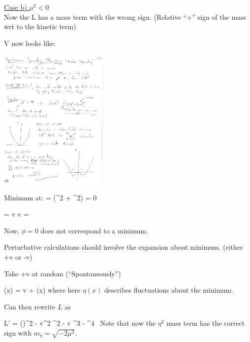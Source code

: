 {\clearpage

\underline{Case b) $\mu^2 < 0$}\\

Now the L has a mass term with the wrong sign.  
(Relative ``+'' sign of the mass wrt to the kinetic term)

V now looks like:

\bc
\includegraphics[width=0.4\textwidth]{./V_mu2negative.pdf}
\ec

Minimum at:
\be
{} = \phi (\mu^2 + \lambda \phi^2) = 0 
\ee

\be
\phi = \pm v  \hspace*{1in} v = \sqrt{-\mu^2\lambda}
\ee

Now, $\phi=0$ does not correspond to a minimum.

Perturbative calculations should involve the expansion about minimum.  (either +v or -v) 

Take +v at random (``Spontaneously'') 

\be
\phi(x) = v + \eta(x)
\ee
where here $\eta(x)$ describes fluctuations about the minimum. 

Can then rewrite $L$ as 

\be
L' =  (\partial \eta)^2 - \lambda v^2 \eta^2 - \lambda v \eta^3 - \lambda \eta^4\ 
\ee
Note that now the $\eta^2$ mass term has the correct sign with $m_\eta = \sqrt{-2\mu^2}$.

}
